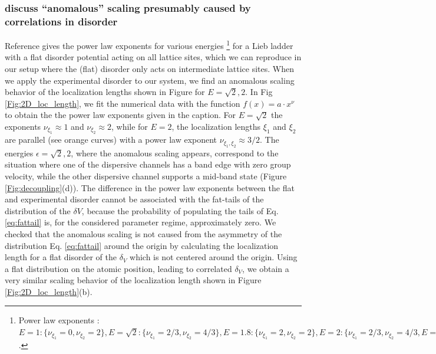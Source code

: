 \documentclass[prl,aps,twocolumn,showpacs,superscriptaddress,longbibliography]{revtex4-1}
\begin{document}
\subsubsection{discuss ``anomalous'' scaling presumably caused by correlations in disorder}
Reference \cite{Leykam2017} gives the power law exponents for various energies
%
\footnote{Power law exponents \cite{Leykam2017}:
$
E = 1:\{\nu_{\xi_1} = 0,\nu_{\xi_2} = 2\}, E = \sqrt 2:\{\nu_{\xi_1} = 2/3,\nu_{\xi_2} = 4/3\},E = 1.8:\{\nu_{\xi_1} = 2,\nu_{\xi_2} = 2\},
E = 2:\{\nu_{\xi_1} = 2/3,\nu_{\xi_2} = 4/3,E = \sqrt 6:\{\nu_{\xi_1} = 0,\nu_{\xi_2} = 2/3\}\}
$.}
for a Lieb ladder with a flat disorder 
potential acting on all lattice sites, which we can reproduce in our setup where the (flat) disorder only acts on intermediate lattice sites.
%
When we apply the experimental disorder to our system, we find an anomalous scaling behavior of the localization lengths
shown in Figure for $E = \sqrt{2}, 2$. In Fig \ref{Fig:2D_loc_length}, we fit the numerical data with the function $f(x) = a \cdot x^\nu$ to obtain the
the power law exponents given in the caption.
For $E = \sqrt 2$ the exponents $\nu_{\xi_1}\approx 1$ and  $\nu_{\xi_2}\approx 2$, while for $E = 2$, the localization lengths $\xi_1$ and $\xi_2$ are parallel (see orange curves) with a
power law exponent $\nu_{\xi_1,\xi_2} \approx 3/2$.
The energies $\epsilon = \sqrt 2, 2$, where the anomalous scaling appears, correspond to the situation where one of the dispersive channels has a band edge with zero group velocity,
while the other dispersive channel 
supports a mid-band state (Figure \ref{Fig:decoupling}(d)).
The difference in the power law exponents between the flat and experimental disorder cannot be 
associated with the fat-tails of the distribution of the $\delta V$, because 
the probability of populating the tails of Eq. \eqref{eq:fattail} is, for the considered parameter regime, approximately zero.
We checked that the anomalous scaling is not caused from the asymmetry of the distribution Eq. \eqref{eq:fattail} around the origin by calculating
the localization length for a flat disorder of the $\delta_V$ which is not centered around the origin.
Using a flat distribution on the atomic position, leading to correlated $\delta_V$, we obtain a very similar scaling behavior of the localization
length shown in Figure \ref{Fig:2D_loc_length}(b).













\end{document}
